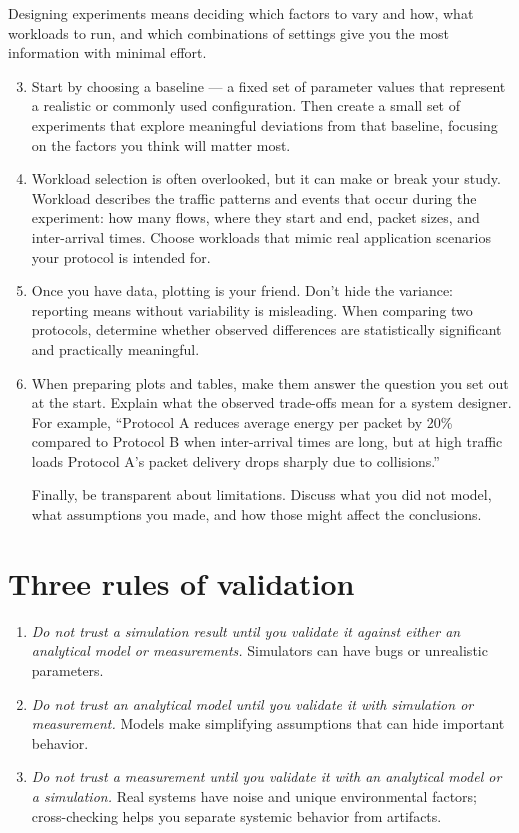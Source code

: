 Designing experiments means deciding which factors to vary and how, what workloads to run, and which combinations of settings give you the most information with minimal effort.
\begin{enumerate}
    \setcounter{enumi}{2}
    \item Start by choosing a baseline — a fixed set of parameter values that represent a realistic or commonly used configuration. Then create a small set of experiments that explore meaningful deviations from that baseline, focusing on the factors you think will matter most.

    \item Workload selection is often overlooked, but it can make or break your study. Workload describes the traffic patterns and events that occur during the experiment: how many flows, where they start and end, packet sizes, and inter-arrival times. Choose workloads that mimic real application scenarios your protocol is intended for.

    \item Once you have data, plotting is your friend. Don’t hide the variance: reporting means without variability is misleading. When comparing two protocols, determine whether observed differences are statistically significant and practically meaningful.

    \item When preparing plots and tables, make them answer the question you set out at the start. 
    Explain what the observed trade-offs mean for a system designer. For example, “Protocol A reduces average energy per packet by 20\% compared to Protocol B when inter-arrival times are long, but at high traffic loads Protocol A’s packet delivery drops sharply due to collisions.”

    Finally, be transparent about limitations. Discuss what you did not model, what assumptions you made, and how those might affect the conclusions.
\end{enumerate}

\section{Three rules of validation}
\begin{enumerate}
    \item \textit{Do not trust a simulation result until you validate it against either an analytical model or measurements.} Simulators can have bugs or unrealistic parameters.
    \item \textit{Do not trust an analytical model until you validate it with simulation or measurement.} Models make simplifying assumptions that can hide important behavior.
    \item \textit{Do not trust a measurement until you validate it with an analytical model or a simulation.} Real systems have noise and unique environmental factors; cross-checking helps you separate systemic behavior from artifacts.
\end{enumerate}

